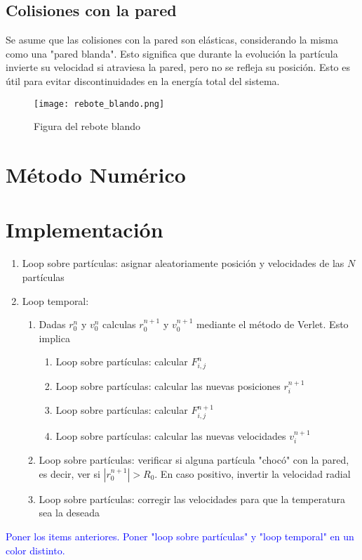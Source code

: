 \documentclass[aps,prb,twocolumn,superscriptaddress,floatfix,longbibliography]{revtex4-2}
\newif\ifptitle
\newif\ifpnumber
\newcounter{para}
\newcommand\ptitle[1]{\par\refstepcounter{para}
{\ifpnumber{\noindent\textcolor{lightgray}{\textbf{\thepara}}\indent}\fi}
{\ifptitle{\textbf{[{#1}]}}\fi}}
\begin{document}
\subsection{Colisiones con la pared}

Se asume que las colisiones con la pared son elásticas, considerando la misma como una "pared blanda". Esto significa que durante la evolución la partícula invierte su velocidad si atraviesa la pared, pero no se refleja su posición. Esto es útil para evitar discontinuidades en la energía total del sistema.


\begin{figure}[h]
    \texttt{[image: rebote\_blando.png]}
    \caption{Figura del rebote blando}
     \label{fig:rebote_blando}
\end{figure}

\section{Método Numérico}

\section{Implementación}



\ptitle{¿Qué pasos debe hacer nuestro código para calcular la evolución del gas de electrones?}

\begin{enumerate}
    \item Loop sobre partículas: asignar aleatoriamente posición y velocidades de las $N$ partículas
    \item Loop temporal:
    \begin{enumerate}
        \item Dadas $r_0^n$ y $v_0^n$ calculas $r_0^{n+1}$ y $v_0^{n+1}$ mediante el método de Verlet. Esto implica
        \begin{enumerate}
            \item Loop sobre partículas: calcular $F_{i,j}^n$
            \item Loop sobre partículas: calcular las nuevas posiciones $r_{i}^{n+1}$
            \item Loop sobre partículas: calcular $F_{i,j}^{n+1}$
            \item Loop sobre partículas: calcular las nuevas velocidades $v_{i}^{n+1}$
        \end{enumerate}
        \item Loop sobre partículas: verificar si alguna partícula "chocó" con la pared, es decir, ver si $|r_0^{n+1}| > R_0$. En caso positivo, invertir la velocidad radial
        \item Loop sobre partículas: corregir las velocidades para que la temperatura sea la deseada
    \end{enumerate}
\end{enumerate}
\textcolor{blue}{Poner los items anteriores. Poner "loop sobre partículas" y "loop temporal" en un color distinto.}
\end{document}
